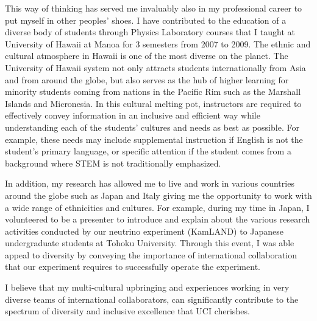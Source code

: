 \documentclass[10pt]{article} %
\begin{document}
This way of thinking has served me invaluably also in my professional career to
put myself in other peoples' shoes. I have contributed to the education of a
diverse body of students through Physics Laboratory courses that I taught at
University of Hawaii at Manoa for 3 semesters from 2007 to 2009. The ethnic and
cultural atmosphere in Hawaii is one of the most diverse on the planet. The
University of Hawaii system not only attracts students internationally from
Asia and from around the globe, but also serves as the hub of higher learning
for minority students coming from nations in the Pacific Rim such as the
Marshall Islands and Micronesia. In this cultural melting pot, instructors are
required to effectively convey information in an inclusive and efficient way
while understanding each of the students' cultures and needs as best as
possible. For example, these needs may include supplemental instruction if
English is not the student's primary language, or specific attention if the
student comes from a background where STEM is not traditionally emphasized.

In addition, my research has allowed me to live and work in various countries
around the globe such as Japan and Italy giving me the opportunity to work with
a wide range of ethnicities and cultures. For example, during my time in Japan,
I volunteered to be a presenter to introduce and explain about the various
research activities conducted by our neutrino experiment (KamLAND) to Japanese
undergraduate students at Tohoku University. Through this event, I was able
appeal to diversity by conveying the importance of international collaboration
that our experiment requires to successfully operate the experiment.

I believe that my multi-cultural upbringing and experiences working in very
diverse teams of international collaborators, can significantly contribute to
the spectrum of diversity and inclusive excellence that UCI cherishes.

\end{document}
